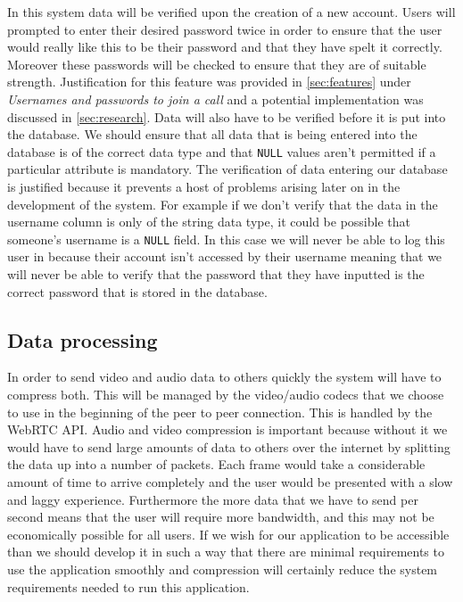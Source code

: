 In this system data will be verified upon the creation of a
new account. Users will prompted to enter their desired
password twice in order to ensure that the user would really 
like this to be their password and that they have spelt it 
correctly. Moreover these passwords will be checked to 
ensure that they are of suitable strength. Justification for 
this feature was provided in \ref{sec:features} under 
\textit{Usernames and passwords to join a call} and a
potential implementation was discussed in \ref{sec:research}.
Data will also have to be verified before it is put into the 
database. We should ensure that all data that is being entered
into the database is of the correct data type and that
\texttt{NULL} values aren't permitted if a particular 
attribute is mandatory. The verification of data entering our
database is justified because it prevents a host of problems 
arising later on in the development of the system. For example
if we don't verify that the data in the username column is 
only of the string data type, it could be possible that 
someone's username is a \texttt{NULL} field. In this case we 
will never be able to log this user in because their account
isn't accessed by their username meaning that we will never be
able to verify that the password that they have inputted is the 
correct password that is stored in the database.

\subsection{Data processing}

In order to send video and audio data to others quickly the 
system will have to compress both. This will be managed by the
video/audio codecs that we choose to use in the beginning of
the peer to peer connection. This is handled by the
WebRTC API. Audio and video compression is 
important because without it we would have to send large 
amounts of data to others over the internet by splitting the
data up into a number of packets. Each frame would take a 
considerable amount of time to arrive completely and the user
would be presented with a slow and laggy experience.
Furthermore the more data that we have to send per second 
means that the user will require more bandwidth, and this 
may not be economically possible for all users. If we wish 
for our application to be accessible than we should develop it
in such a way that there are minimal requirements to use the 
application smoothly and compression will certainly reduce the
system requirements needed to run this application.

